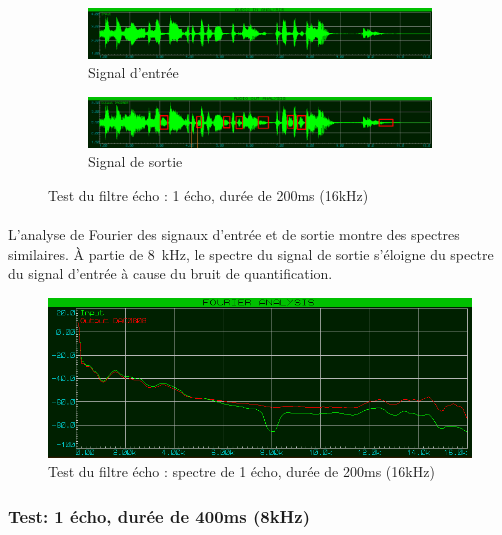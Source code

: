 \documentclass{article}
\begin{document}
    \begin{figure}[H]
        \centering
        \begin{subfigure}[b]{\textwidth}
            \centering
            \includegraphics[width=\textwidth]{./images/in_echo_16k.png}
            \caption{Signal d'entrée}
        \end{subfigure}
        \begin{subfigure}[b]{\textwidth}
            \centering
            \includegraphics[width=\textwidth]{./images/out_echo_1_200ms_16k.png}
            \caption{Signal de sortie}
            \label{fig:echo_16k_out}
        \end{subfigure}
        \caption{Test du filtre écho : 1 écho, durée de 200ms (16kHz)}
        \label{fig:echo_16k}
    \end{figure}

    \paragraph{}
    L'analyse de Fourier des signaux d'entrée et de sortie montre des spectres similaires. À partie de \SI{8}{\kilo\hertz}, le spectre du signal de sortie s'éloigne du spectre du signal d'entrée à cause du bruit de quantification.

    \begin{figure}[H]
        \centering
        \includegraphics[width=.6\textwidth]{./images/spectrum_echo_1_200ms_16k.png}
        \caption{Test du filtre écho : spectre de 1 écho, durée de 200ms (16kHz)}
    \end{figure}

    \subsubsection{Test: 1 écho, durée de 400ms (8kHz)}
\end{document}
